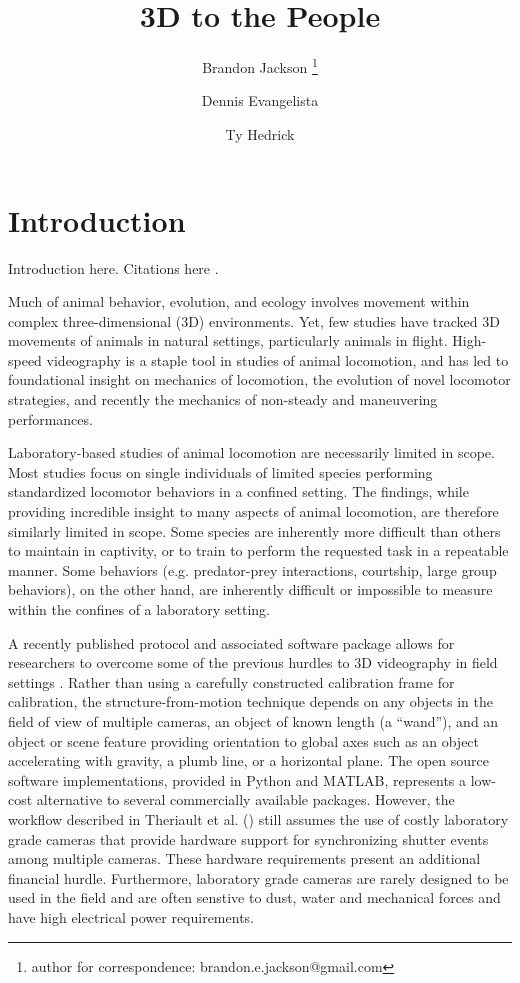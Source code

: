 \documentclass[fleqn,10pt]{wlpeerj}
\title{3D to the People} %
\author[1,2]{Brandon Jackson \thanks{author for correspondence: brandon.e.jackson@gmail.com}}
\author[2]{Dennis Evangelista}
\author[2]{Ty Hedrick}
\affil[1]{Longwood College, Charlottesville, VA}
\affil[2]{University of North Carolina at Chapel Hill, NC 27599-3280, USA}
\begin{document}
\newcommand{\ty}[1]{{\color{blue} #1}}
\newcommand{\dennis}[1]{{\color{green} #1}}
\newcommand{\brandon}[1]{{\color{cyan} #1}}

\flushbottom
\maketitle
\thispagestyle{empty}

\modulolinenumbers[5]
\linenumbers

\section*{Introduction}

Introduction here. Citations here \citep{Bradski:2008}. 

Much of animal behavior, evolution, and ecology involves movement within complex three-dimensional (3D) environments.  Yet, few studies have tracked 3D movements of animals in natural settings, particularly animals in flight.  High-speed videography is a staple tool in studies of animal locomotion, and has led to foundational insight on mechanics of locomotion, the evolution of novel locomotor strategies, and recently the mechanics of non-steady and maneuvering performances.  

Laboratory-based studies of animal locomotion are necessarily limited in scope.  Most studies focus on single individuals of limited species performing standardized locomotor behaviors \ty{in a confined setting}.  The findings, while providing incredible insight to many aspects of animal locomotion, are therefore similarly limited in scope.  Some species are inherently more difficult than others to maintain in captivity, or to train to perform the requested task in a repeatable manner.  Some behaviors (e.g. predator-prey interactions, courtship, large group behaviors), on the other hand, are inherently \ty{difficult or }impossible to measure within the confines of a laboratory setting.  

A recently published \ty{protocol and associated software package} allows for researchers to overcome some of the previous hurdles to 3D videography in field settings \citep{Theriault:2014}.  Rather than using a carefully constructed calibration frame for calibration, the structure-from-motion technique depends on any objects in the field of view of multiple cameras, an object of known length (a “wand”), and an object \ty{or scene feature} providing orientation to global axes such as an object accelerating with gravity, a plumb line, or a horizontal plane.  \ty{The open source software implementations, provided in Python and MATLAB, represents a low-cost alternative to several commercially available packages.  However, the workflow described in Theriault et al. (\citeyear{Theriault:2014}) still assumes the use of costly laboratory grade cameras that provide hardware support for synchronizing shutter events among multiple cameras. These hardware requirements present an additional financial hurdle. Furthermore, laboratory grade cameras are rarely designed to be used in the field and are often senstive to dust, water and mechanical forces and have high electrical power requirements.}
\end{document}
